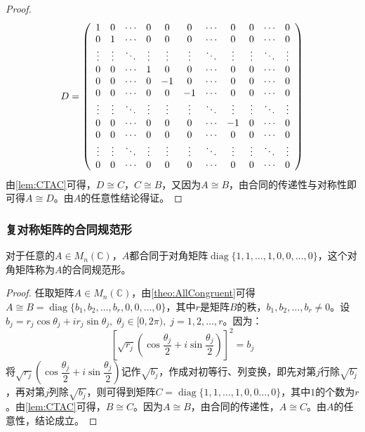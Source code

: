 \begin{proof}
	\begin{equation*}
		D=
		\left(
		\begin{array}{*{11}c}
			1 & 0 & \cdots & 0 & 0 & 0 & \cdots & 0 & 0 & \cdots & 0 \\
			0 & 1 & \cdots & 0 & 0 & 0 & \cdots & 0 & 0 & \cdots & 0 \\
			\vdots & \vdots & \ddots & \vdots & \vdots & \vdots & \ddots & \vdots & \vdots & \ddots & \vdots \\
			0 & 0 & \cdots & 1 & 0 & 0 & \cdots & 0 & 0 & \cdots & 0 \\
			0 & 0 & \cdots & 0 & -1 & 0 & \cdots & 0 & 0 & \cdots & 0 \\
			0 & 0 & \cdots & 0 & 0 & -1 & \cdots & 0 & 0 & \cdots & 0 \\
			\vdots & \vdots & \ddots & \vdots & \vdots & \vdots & \ddots & \vdots & \vdots & \ddots & \vdots \\
			0 & 0 & \cdots & 0 & 0 & 0 & \cdots & -1 & 0 & \cdots & 0 \\
			0 & 0 & \cdots & 0 & 0 & 0 & \cdots & 0 & 0 & \cdots & 0 \\
			\vdots & \vdots & \ddots & \vdots & \vdots & \vdots & \ddots & \vdots & \vdots & \ddots & \vdots \\
			0 & 0 & \cdots & 0 & 0 & 0 & \cdots & 0 & 0 & \cdots & 0 \\
		\end{array}
		\right)
	\end{equation*}
	由\cref{lem:CTAC}可得，$D\cong C$，$C\cong B$，又因为$A\cong B$，由合同的传递性与对称性即可得$A\cong D$。由$A$的任意性结论得证。
\end{proof}
\subsubsection{复对称矩阵的合同规范形}
\begin{theorem}\label{theo:Congruent10}
	对于任意的$A\in M_{n}(\mathbb{C})$，$A$都合同于对角矩阵$\operatorname{diag}\{1,1,\dots,1,0,0,\dots,0\}$，这个对角矩阵称为$A$的合同规范形。
\end{theorem}
\begin{proof}
	任取矩阵$A\in M_{n}(\mathbb{C})$，由\cref{theo:AllCongruent}可得$A\cong B=\operatorname{diag}\{b_1,b_2,\dots,b_r,0,0,\dots,0\}$，其中$r$是矩阵$B$的秩，$b_1,b_2,\dots,b_r\ne0$。设$b_j=r_j\cos\theta_j+ir_j\sin\theta_j,\;\theta_j\in[0,2\pi),\;j=1,2,\dots,r$。因为：
	\begin{equation*}
		\left[\sqrt{r_j}\left(\cos\frac{\theta_j}{2}+i\sin\frac{\theta_j}{2}\right)\right]^2=b_j
	\end{equation*}
	将$\sqrt{r_j}\left(\cos\dfrac{\theta_j}{2}+i\sin\dfrac{\theta_j}{2}\right)$记作$\sqrt{b_j}$，作成对初等行、列变换，即先对第$j$行除$\sqrt{b_j}$，再对第$j$列除$\sqrt{b_j}$，则可得到矩阵$C=\operatorname{diag}\{1,1,\dots,1,0,0\dots,0\}$，其中$1$的个数为$r$。由\cref{lem:CTAC}可得，$B\cong C$。因为$A\cong B$，由合同的传递性，$A\cong C$。由$A$的任意性，结论成立。
\end{proof}